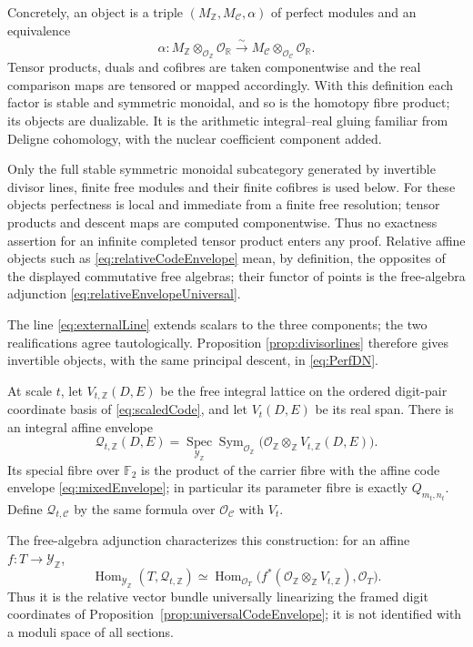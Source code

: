 \documentclass[11pt]{amsart}
\theoremstyle{definition}
\theoremstyle{remark}
\newcommand{\R}{\mathbb R}
\newcommand{\Z}{\mathbb Z}
\begin{document}
Concretely, an object is a triple $(M_{\Z},M_{\mathcal C},\alpha)$ of
perfect modules and an equivalence
\[
 \alpha:M_{\Z}\otimes_{\mathcal O_{\Z}}\mathcal O_{\R}
 \xrightarrow{\sim}
 M_{\mathcal C}\otimes_{\mathcal O_{\mathcal C}}\mathcal O_{\R}.
\]
Tensor products, duals and cofibres are taken componentwise and the real
comparison maps are tensored or mapped accordingly.  With this definition
each factor is stable and symmetric monoidal, and so is the homotopy fibre
product; its objects are dualizable.  It is the arithmetic
integral--real gluing familiar from Deligne cohomology, with the nuclear
coefficient component added.

Only the full stable symmetric monoidal subcategory generated by invertible
divisor lines, finite free modules and their finite cofibres is used below.
For these objects perfectness is local and immediate from a finite free
resolution; tensor products and descent maps are computed componentwise.
Thus no exactness assertion for an infinite completed tensor product enters
any proof.  Relative affine objects such as
\eqref{eq:relativeCodeEnvelope} mean, by definition, the opposites of the
displayed commutative free algebras; their functor of points is the
free-algebra adjunction \eqref{eq:relativeEnvelopeUniversal}.

The line \eqref{eq:externalLine} extends scalars to the three components;
the two realifications agree tautologically.  Proposition
\ref{prop:divisorlines} therefore gives invertible objects, with the same
principal descent, in \eqref{eq:PerfDN}.

At scale $t$, let $V_{t,\Z}(D,E)$ be the free integral lattice on the
ordered digit-pair coordinate basis of \eqref{eq:scaledCode}, and let
$V_t(D,E)$ be its real span.  There is an integral affine envelope
\begin{equation}\label{eq:relativeCodeEnvelope}
 \mathcal Q_{t,\Z}(D,E)=
 \underset{\mathscr Y_{\Z}}{\operatorname{Spec}}
 \operatorname{Sym}_{\mathcal O_{\Z}}
 \bigl(\mathcal O_{\Z}\otimes_{\Z}V_{t,\Z}(D,E)\bigr).
\end{equation}
Its special fibre over $\mathbb F_2$ is the product of the carrier fibre
with the affine code envelope \eqref{eq:mixedEnvelope}; in particular its
parameter fibre is exactly $Q_{m_t,n_t}$.  Define
$\mathcal Q_{t,\mathcal C}$ by the same
formula over $\mathcal O_{\mathcal C}$ with $V_t$.

The free-algebra adjunction characterizes this construction: for an affine
$f:T\to\mathscr Y_{\Z}$,
\begin{equation}\label{eq:relativeEnvelopeUniversal}
 \operatorname{Hom}_{\mathscr Y_{\Z}}(T,\mathcal Q_{t,\Z})
 \simeq
 \operatorname{Hom}_{\mathcal O_T}
 \bigl(f^*(\mathcal O_{\Z}\otimes_{\Z}V_{t,\Z}),\mathcal O_T\bigr).
\end{equation}
Thus it is the relative vector bundle universally linearizing the framed
digit coordinates of Proposition~\ref{prop:universalCodeEnvelope}; it is
not identified with a moduli space of all sections.
\end{document}
